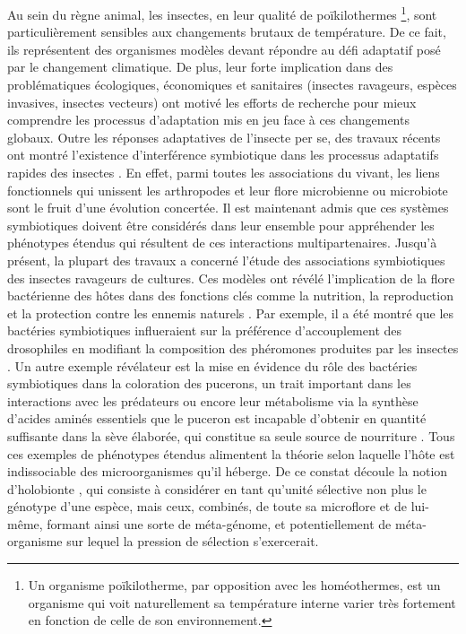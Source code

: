 Au sein du règne animal, les insectes, en leur qualité de poïkilothermes%
\footnote{Un organisme poïkilotherme, par opposition avec les homéothermes, est un organisme qui voit naturellement sa température interne varier très fortement en fonction de celle de son environnement.},
sont particulièrement sensibles aux changements brutaux de température.
De ce fait, ils représentent des organismes modèles devant répondre au défi adaptatif posé par le changement climatique.
De plus, leur forte implication dans des problématiques écologiques, économiques et sanitaires (insectes ravageurs, espèces invasives, insectes vecteurs) ont motivé les efforts de recherche pour mieux comprendre les processus d'adaptation mis en jeu face à ces changements globaux.
Outre les réponses adaptatives de l'insecte per se, des travaux récents ont montré l'existence d'interférence symbiotique dans les processus adaptatifs rapides des insectes \cite{feldhaar2011}.
En effet, parmi toutes les associations du vivant, les liens fonctionnels qui unissent les arthropodes et leur flore microbienne ou microbiote sont le fruit d'une évolution concertée.
Il est maintenant admis que ces systèmes symbiotiques doivent être considérés dans leur ensemble pour appréhender les phénotypes étendus qui résultent de ces interactions multipartenaires.
Jusqu'à présent, la plupart des travaux a concerné l'étude des  associations  symbiotiques  des  insectes  ravageurs  de  cultures.
Ces  modèles  ont  révélé  l'implication  de  la  flore  bactérienne  des  hôtes  dans  des  fonctions  clés  comme  la nutrition, la reproduction et la protection contre les ennemis naturels \cite{dillondillon}.
Par exemple, il a été montré que les bactéries symbiotiques influeraient sur la préférence d'accouplement des drosophiles en modifiant la composition des phéromones produites par les insectes \cite{sharon2010}.
Un autre exemple révélateur est la mise en évidence du rôle des bactéries symbiotiques dans la coloration des pucerons, un trait important dans les interactions avec les prédateurs \cite{tsuchida2010} ou encore leur métabolisme via la synthèse d'acides aminés essentiels que le puceron est incapable d'obtenir en quantité suffisante dans la sève élaborée, qui constitue sa seule source de nourriture \cite{douglas1998}.
Tous ces exemples de phénotypes étendus alimentent la théorie selon laquelle l'hôte est indissociable des microorganismes qu'il héberge.
De ce constat découle la notion d'holobionte \cite{rosenberg2007}, qui consiste à considérer en tant qu'unité sélective non plus le génotype d'une espèce, mais ceux, combinés, de toute sa microflore et de lui-même, formant ainsi une sorte de méta-génome, et potentiellement de méta-organisme sur lequel la pression de sélection s'exercerait.

